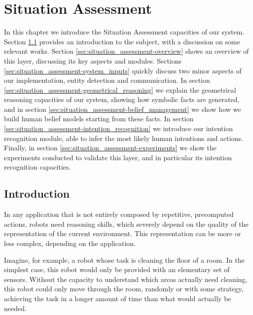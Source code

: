 
\chapter{Situation Assessment} %

\label{chapter:situation_assessment} %


In this chapter we introduce the Situation Assessment capacities of our system. Section \ref{sec:situation_assessment-intro} provides an introduction to the subject, with a discussion on some relevant works. Section \ref{sec:situation_assessment-overview} shows an overview of this layer, discussing its key aspects and modules. Sections \ref{sec:situation_assessment-system_inputs}  quickly discuss two minor aspects of our implementation, entity detection and communication. In section \ref{sec:situation_assessment-geometrical_reasoning} we explain the geometrical reasoning capacities of our system, showing how symbolic facts are generated, and in section \ref{sec:situation_assessment-belief_management} we show how we build human belief models starting from these facts. In section \ref{sec:situation_assessment-intention_recognition} we introduce our intention recognition module, able to infer the most likely human intentions and actions. Finally, in section \ref{sec:situation_assessment-experiments} we show the experiments conducted to validate this layer, and in particular its intention recognition capacities.

\section{Introduction}
\label{sec:situation_assessment-intro}
In any application that is not entirely composed by repetitive, precomputed actions, robots need reasoning skills, which severely depend on the quality of the representation of the current environment. This representation can be more or less complex, depending on the application. 

Imagine, for example, a robot whose task is cleaning the floor of a room. In the simplest case, this robot would only be provided with an elementary set of sensors. Without the capacity to understand which areas actually need cleaning, this robot could only move through the room, randomly or with some strategy, achieving the task in a longer amount of time than what would actually be needed. 

